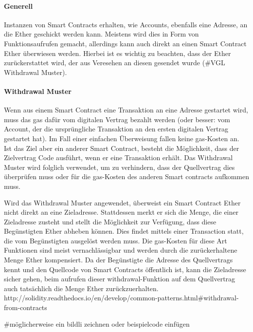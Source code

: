 \paragraph{Generell}
Instanzen von Smart Contracts erhalten, wie Accounts, ebenfalls eine Adresse, an die Ether geschickt werden kann. Meistens wird dies in Form von Funktionsaufrufen gemacht, allerdings kann auch direkt an einen Smart Contract Ether überwiesen werden. Hierbei ist es wichtig zu beachten, dass der Ether zurückerstattet wird, der aus Veresehen an diesen gesendet wurde (\#VGL Withdrawal Muster).

\paragraph{Withdrawal Muster}
Wenn aus einem Smart Contract eine Transaktion an eine Adresse gestartet wird, muss das gas dafür vom digitalen Vertrag bezahlt werden (oder besser: vom Account, der die ursprüngliche Transaktion an den ersten digitalen Vertrag gestartet hat). Im Fall einer einfachen Überweisung fallen keine gas-Kosten an. Ist das Ziel aber ein anderer Smart Contract, besteht die Möglichkeit, dass der Zielvertrag Code ausführt, wenn er eine Transaktion erhält. Das Withdrawal Muster wird folglich verwendet, um zu verhindern, dass der Quellvertrag dies überprüfen muss oder für die gas-Kosten des anderen Smart contracts aufkommen muss.

Wird das Withdrawal Muster angewendet, überweist ein Smart Contract Ether nicht direkt an eine Zieladresse. Stattdessen merkt er sich die Menge, die einer Zieladresse zusteht und stellt die Möglichkeit zur Verfügung, dass diese Begünstigten Ether abheben können. Dies findet mittels einer Transaction statt, die vom Begünstigten ausgelöst werden muss. Die gas-Kosten für diese Art Funktionen sind meist vernachlässigbar und werden durch die zurückerhaltene Menge Ether kompensiert. Da der Begünstigte die Adresse des Quellvertrags kennt und den Quellcode von Smart Contracts öffentlich ist, kann die Zieladresse sicher gehen, beim aufrufen dieser withdrawal-Funktion auf dem Quellvertrag auch tatsächlich die Menge Ether zurückzuerhalten.
http://solidity.readthedocs.io/en/develop/common-patterns.html\#withdrawal-from-contracts

\#möglicherweise ein bildli zeichnen oder beispielcode einfügen



